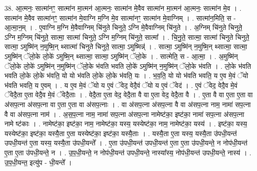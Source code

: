 \documentclass[17pt]{extarticle}
\begin{document}
38. आ॒त्मनः॒ सात्मा॑नꣳ॒॒ सात्मा॑न मा॒त्मन॑ आ॒त्मनः॒ सात्मा॑न मे॒वैव सात्मा॑न मा॒त्मन॑ आ॒त्मनः॒ सात्मा॑न मे॒व । . सात्मा॑न मे॒वैव सात्मा॑नꣳ॒॒ सात्मा॑न मे॒वाग्नि म॒ग्नि मे॒व सात्मा॑नꣳ॒॒ सात्मा॑न मे॒वाग्निम् । . सात्मा॑न॒मिति॒ स - आ॒त्मा॒न॒म् । . ए॒वाग्नि म॒ग्नि मे॒वैवाग्निम् चि॑नुते चिनुते॒ ऽग्नि मे॒वैवाग्निम् चि॑नुते । . अ॒ग्निम् चि॑नुते चिनुते॒ ऽग्नि म॒ग्निम् चि॑नुते॒ सात्मा॒ सात्मा॑ चिनुते॒ ऽग्नि म॒ग्निम् चि॑नुते॒ सात्मा᳚ । . चि॒नु॒ते॒ सात्मा॒ सात्मा॑ चिनुते चिनुते॒ सात्मा॒ ऽमुष्मि॑न् न॒मुष्मि॒न् थ्सात्मा॑ चिनुते चिनुते॒ सात्मा॒ ऽमुष्मिन्न्॑ । . सात्मा॒ ऽमुष्मि॑न् न॒मुष्मि॒न् थ्सात्मा॒ सात्मा॒ ऽमुष्मि॑न् ॅलो॒के लो॒के॑ ऽमुष्मि॒न् थ्सात्मा॒ सात्मा॒ ऽमुष्मि॑न् ॅलो॒के । . सात्मेति॒ स - आ॒त्मा॒ । . अ॒मुष्मि॑न् ॅलो॒के लो॒के॑ ऽमुष्मि॑न् न॒मुष्मि॑न् ॅलो॒के भ॑वति भवति लो॒के॑ ऽमुष्मि॑न् न॒मुष्मि॑न् ॅलो॒के भ॑वति । . लो॒के भ॑वति भवति लो॒के लो॒के भ॑वति॒ यो यो भ॑वति लो॒के लो॒के भ॑वति॒ यः । . भ॒व॒ति॒ यो यो भ॑वति भवति॒ य ए॒व मे॒वं ॅयो भ॑वति भवति॒ य ए॒वम् । . य ए॒व मे॒वं ॅयो य ए॒वं ॅवेद॒ वेदै॒वं ॅयो य ए॒वं ॅवेद॑ । . ए॒वं ॅवेद॒ वेदै॒व मे॒वं ॅवेदै॒ता ए॒ता वेदै॒व मे॒वं ॅवेदै॒ताः । . वेदै॒ता ए॒ता वेद॒ वेदै॒ता वै वा ए॒ता वेद॒ वेदै॒ता वै । . ए॒ता वै वा ए॒ता ए॒ता वा अ॑सप॒त्ना अ॑सप॒त्ना वा ए॒ता ए॒ता वा अ॑सप॒त्नाः । . वा अ॑सप॒त्ना अ॑सप॒त्ना वै वा अ॑सप॒त्ना नाम॒ नामा॑ सप॒त्ना वै वा अ॑सप॒त्ना नाम॑ । . अ॒स॒प॒त्ना नाम॒ नामा॑ सप॒त्ना अ॑सप॒त्ना नामेष्ट॑का॒ इष्ट॑का॒ नामा॑ सप॒त्ना अ॑सप॒त्ना नामे ष्ट॑काः । . नामेष्ट॑का॒ इष्ट॑का॒ नाम॒ नामेष्ट॑का॒ यस्य॒ यस्येष्ट॑का॒ नाम॒ नामेष्ट॑का॒ यस्य॑ । . इष्ट॑का॒ यस्य॒ यस्येष्ट॑का॒ इष्ट॑का॒ यस्यै॒ता ए॒ता यस्येष्ट॑का॒ इष्ट॑का॒ यस्यै॒ताः । . यस्यै॒ता ए॒ता यस्य॒ यस्यै॒ता उ॑पधी॒यन्त॑ उपधी॒यन्त॑ ए॒ता यस्य॒ यस्यै॒ता उ॑पधी॒यन्ते᳚ । . ए॒ता उ॑पधी॒यन्त॑ उपधी॒यन्त॑ ए॒ता ए॒ता उ॑पधी॒यन्ते॒ न नोप॑धी॒यन्त॑ ए॒ता ए॒ता उ॑पधी॒यन्ते॒ न । . उ॒प॒धी॒यन्ते॒ न नोप॑धी॒यन्त॑ उपधी॒यन्ते॒ नास्या᳚स्य॒ नोप॑धी॒यन्त॑ उपधी॒यन्ते॒ नास्य॑ । . उ॒प॒धी॒यन्त॒ इत्यु॑प - धी॒यन्ते᳚ । \newline
\pagebreak
{}
\end{document}
